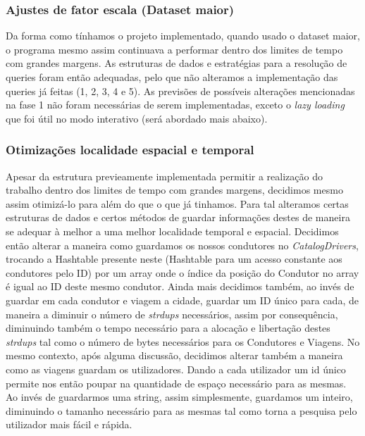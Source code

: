 \documentclass{article}
\begin{document}
        \subsubsection{Ajustes de fator escala (Dataset maior)}
            Da forma como tínhamos o projeto implementado, quando 
            usado o dataset maior, o programa mesmo assim continuava
            a performar dentro dos limites de tempo com grandes 
            margens. As estruturas de dados e estratégias para
            a resolução de queries foram então adequadas, pelo que
            não alteramos a implementação das queries já feitas
            (1, 2, 3, 4 e 5). As previsões de possíveis alterações
            mencionadas na fase 1 não foram necessárias de serem
            implementadas, exceto o \emph{lazy loading} que foi
            útil no modo interativo (será abordado mais abaixo).

        \subsubsection{Otimizações localidade espacial e temporal}
            Apesar da estrutura previeamente implementada permitir a realização
            do trabalho dentro dos limites de tempo com grandes margens, decidimos
            mesmo assim otimizá-lo para além do que o que já tinhamos. Para tal
            alteramos certas estruturas de dados e certos métodos de guardar 
            informações destes de maneira se adequar à melhor a uma melhor localidade 
            temporal e espacial. Decidimos então alterar a maneira como guardamos os 
            nossos condutores no \emph{CatalogDrivers}, trocando a Hashtable presente
            neste (Hashtable para um acesso constante aos condutores pelo ID) por um 
            array onde o índice da posição do Condutor no array é igual ao ID deste 
            mesmo condutor. Ainda mais decidimos também, ao invés de guardar em cada 
            condutor e viagem a cidade, guardar um ID único para cada, de maneira a 
            diminuir o número de \emph{strdups} necessários, assim por consequência, 
            diminuindo também o tempo necessário para a alocação e libertação destes 
            \emph{strdups} tal como o número de bytes necessários para os Condutores e
            Viagens. No mesmo contexto, após alguma discussão, decidimos alterar também
            a maneira como as viagens guardam os utilizadores. Dando a cada utilizador um
            id único permite nos então poupar na quantidade de espaço necessário para as mesmas.
            Ao invés de guardarmos uma string, assim simplesmente, guardamos um inteiro, diminuindo
            o tamanho necessário para as mesmas tal como torna a pesquisa pelo utilizador 
            mais fácil e rápida.
\end{document}
